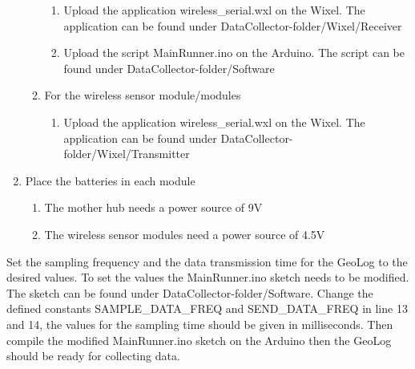 \begin{enumerate}
\begin{enumerate}
\begin{enumerate}
		\item Upload the application wireless\_serial.wxl on the Wixel. The application can be found under DataCollector-folder/Wixel/Receiver
		\item Upload the script MainRunner.ino on the Arduino. The script can be found under DataCollector-folder/Software
		\end{enumerate}
	\item For the wireless sensor module/modules
		\begin{enumerate}
		\item Upload the application wireless\_serial.wxl on the Wixel. The application can be found under DataCollector-folder/Wixel/Transmitter
		\end{enumerate} 
	\end{enumerate}
\item Place the batteries in each module
	\begin{enumerate}
	\item The mother hub needs a power source of 9V
	\item The wireless sensor modules need a power source of 4.5V
	\end{enumerate}
\end{enumerate}

Set the sampling frequency and the data transmission time for the GeoLog to the desired values. To set the values the MainRunner.ino sketch needs to be modified. The sketch can be found under DataCollector-folder/Software. Change the defined constants SAMPLE\_DATA\_FREQ and SEND\_DATA\_FREQ in line 13 and 14, the values for the sampling time should be given in milliseconds. Then compile the modified MainRunner.ino sketch on the Arduino then the GeoLog should be ready for collecting data.\\

